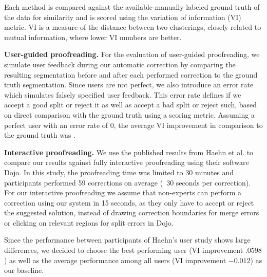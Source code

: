  Each method is compared against the available manually labeled ground truth of the data for similarity and is scored using the variation of information (VI) metric. VI is a measure of the distance between two clusterings, closely related to mutual information, where lower VI numbers are better. 



\textbf{User-guided proofreading.} For the evaluation of user-guided proofreading, we simulate user feedback during our automatic correction by comparing the resulting segmentation before and after each performed correction to the ground truth segmentation. Since users are not perfect, we also introduce an error rate which simulates falsely specified user feedback. This error rate defines if we accept a good split or reject it as well as accept a bad split or reject such, based on direct comparison with the ground truth using a scoring metric. Assuming a perfect user with an error rate of 0, the average VI improvement in comparison to the ground truth was .

\textbf{Interactive proofreading.} We use the published results from Haehn et al. to compare our results against fully interactive proofreading using their software Dojo. In this study, the proofreading time was limited to 30 minutes and participants performed 59 corrections on average (~30 seconds per correction). For our interactive proofreading we assume that  non-experts can perform a correction using our system in 15 seconds, as they only have to accept or reject the suggested solution, instead of drawing correction boundaries for merge errors or clicking on relevant regions for split errors in Dojo. 

Since the performance between participants of Haehn's user study shows large differences, we decided to choose the best performing user (VI improvement $.0598$) as well as the average performance among all users (VI improvement $-0.012$) as our baseline.

